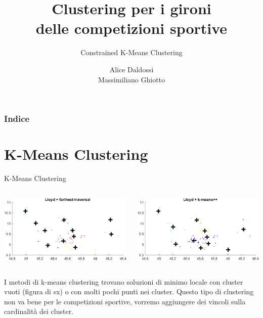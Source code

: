 \documentclass{beamer}
\title{Clustering per i gironi \\delle competizioni sportive}
\subtitle{Constrained K-Means Clustering}
\author{Alice Daldossi \\ Massimiliano Ghiotto}
\institute{Università degli Studi di Pavia}
\date
\begin{document}
	
	\frame{\titlepage}
	
\begin{frame}
	\frametitle{Indice}
	\tableofcontents
\end{frame}

\section{K-Means Clustering}
\begin{frame}{K-Means Clustering}
	\begin{columns}
		\begin{column}{0.5\textwidth}
			\begin{center}
				\includegraphics[width=1\textwidth]{lloyd_ft.png}      
			\end{center}
		\end{column}
		\begin{column}{0.5\textwidth}
			\begin{center}
				\includegraphics[width=1\textwidth]{lloyd_kmpp.png}      
			\end{center}
		\end{column}
	\end{columns}
	\vspace{0.5cm}
	I metodi di k-means clustering trovano soluzioni di minimo locale con cluster vuoti (figura di sx) o con molti pochi punti nei cluster. Questo tipo di clustering non va bene per le competizioni sportive, vorremo aggiungere dei vincoli sulla cardinalità dei cluster.
\end{frame}
\end{document}
